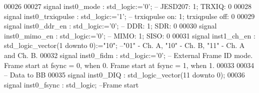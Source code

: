 \begin{DoxyCode}
00026 
00027     \textcolor{keywordflow}{signal} \textcolor{vhdlchar}{inst0_mode}           \textcolor{vhdlchar}{:} \textcolor{comment}{std\_logic}\textcolor{vhdlchar}{:=}\textcolor{vhdlchar}{'}\textcolor{vhdllogic}{}\textcolor{vhdllogic}{0}\textcolor{vhdlchar}{'};\textcolor{keyword}{ -- JESD207: 1; TRXIQ: 0}
00028     \textcolor{keywordflow}{signal} \textcolor{vhdlchar}{inst0_trxiqpulse} \textcolor{vhdlchar}{:} \textcolor{comment}{std\_logic}\textcolor{vhdlchar}{:=}\textcolor{vhdlchar}{'}\textcolor{vhdllogic}{}\textcolor{vhdllogic}{1}\textcolor{vhdlchar}{'};\textcolor{keyword}{ -- trxiqpulse on: 1; trxiqpulse off: 0}
00029     \textcolor{keywordflow}{signal} \textcolor{vhdlchar}{inst0_ddr_en}         \textcolor{vhdlchar}{:} \textcolor{comment}{std\_logic}\textcolor{vhdlchar}{:=}\textcolor{vhdlchar}{'}\textcolor{vhdllogic}{}\textcolor{vhdllogic}{0}\textcolor{vhdlchar}{'};\textcolor{keyword}{ -- DDR: 1; SDR: 0}
00030     \textcolor{keywordflow}{signal} \textcolor{vhdlchar}{inst0_mimo_en}    \textcolor{vhdlchar}{:} \textcolor{comment}{std\_logic}\textcolor{vhdlchar}{:=}\textcolor{vhdlchar}{'}\textcolor{vhdllogic}{}\textcolor{vhdllogic}{0}\textcolor{vhdlchar}{'};\textcolor{keyword}{ -- MIMO: 1; SISO: 0}
00031     \textcolor{keywordflow}{signal} \textcolor{vhdlchar}{inst1_ch_en}      \textcolor{vhdlchar}{:} \textcolor{comment}{std\_logic\_vector}\textcolor{vhdlchar}{(}\textcolor{vhdllogic}{}\textcolor{vhdllogic}{1} \textcolor{keywordflow}{downto} \textcolor{vhdllogic}{}\textcolor{vhdllogic}{0}\textcolor{vhdlchar}{)}\textcolor{vhdlchar}{:=}\textcolor{vhdllogic}{"10"};\textcolor{keyword}{ --"01" - Ch. A, "10" - Ch. B, "11" - Ch.
       A and Ch. B. }
00032     \textcolor{keywordflow}{signal} \textcolor{vhdlchar}{inst0_fidm}           \textcolor{vhdlchar}{:} \textcolor{comment}{std\_logic}\textcolor{vhdlchar}{:=}\textcolor{vhdlchar}{'}\textcolor{vhdllogic}{}\textcolor{vhdllogic}{0}\textcolor{vhdlchar}{'};\textcolor{keyword}{ -- External Frame ID mode. Frame start at fsync = 0, when
       0. Frame start at fsync = 1, when 1. }
00033 
00034 \textcolor{keyword}{    -- Data to BB}
00035     \textcolor{keywordflow}{signal} \textcolor{vhdlchar}{inst0_DIQ}            \textcolor{vhdlchar}{:} \textcolor{comment}{std\_logic\_vector}\textcolor{vhdlchar}{(}\textcolor{vhdllogic}{}\textcolor{vhdllogic}{11} \textcolor{keywordflow}{downto} \textcolor{vhdllogic}{}\textcolor{vhdllogic}{0}\textcolor{vhdlchar}{)};
00036     \textcolor{keywordflow}{signal} \textcolor{vhdlchar}{inst0_fsync}      \textcolor{vhdlchar}{:} \textcolor{comment}{std\_logic};\textcolor{keyword}{ --Frame start}

\end{DoxyCode}
